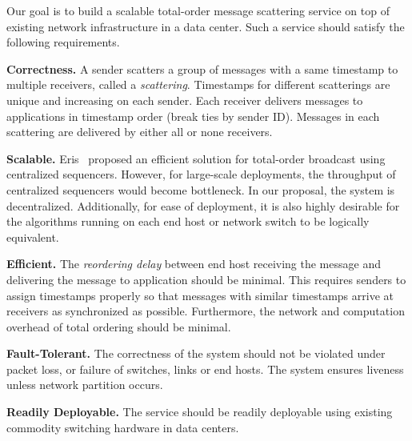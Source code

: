 Our goal is to build a scalable total-order message scattering service on top of existing network infrastructure in a data center.
Such a service should satisfy the following requirements.

\textbf{Correctness.}
A sender scatters a group of messages with a same timestamp to multiple receivers, called a \textit{scattering}.
Timestamps for different scatterings are unique and increasing on each sender.
Each receiver delivers messages to applications in timestamp order (break ties by sender ID).
Messages in each scattering are delivered by either all or none receivers.

\textbf{Scalable.}
Eris~\cite{eris} proposed an efficient solution for total-order  broadcast using centralized sequencers.
However, for large-scale deployments, the throughput of centralized sequencers would become bottleneck.
In our proposal, the system is decentralized.
Additionally, for ease of deployment, it is also highly desirable for the algorithms running on each end host or network switch to be logically equivalent.

\textbf{Efficient.}
The \textit{reordering delay} between end host receiving the message and delivering the message to application should be minimal.
This requires senders to assign timestamps properly so that messages with similar timestamps arrive at receivers as synchronized as possible.
Furthermore, the network and computation overhead of total ordering should be minimal.




\textbf{Fault-Tolerant.}
The correctness of the system should not be violated under packet loss, or failure of switches, links or end hosts.
The system ensures liveness unless network partition occurs.


\textbf{Readily Deployable.}
The service should be readily deployable using existing commodity switching hardware in data centers.


